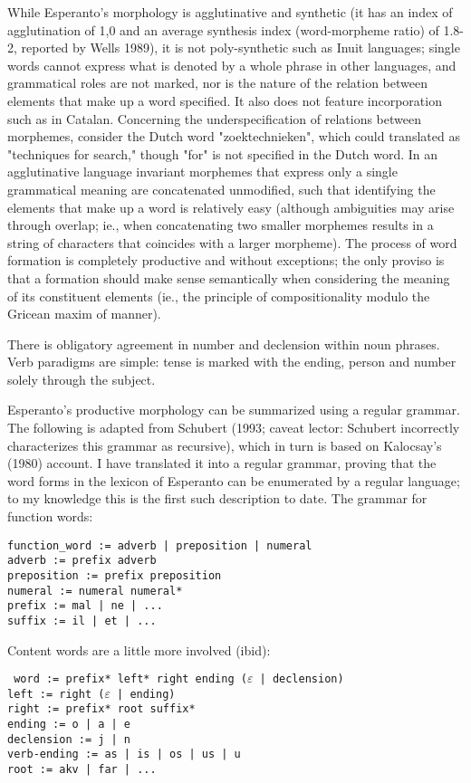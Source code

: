 \documentclass[10pt,a4paper]{article}
\begin{document}
While Esperanto's morphology is agglutinative and synthetic (it has an index of
agglutination of 1,0 and an average synthesis index (word-morpheme ratio) of
1.8-2, reported by Wells 1989), it is not poly-synthetic such as Inuit
languages; single words cannot express what is denoted by a whole phrase
in other languages, and grammatical roles are not marked, nor is the nature of
the relation between elements that make up a word specified. It also does not
feature incorporation such as in Catalan. Concerning the underspecification of
relations between morphemes, consider the Dutch word "zoektechnieken", which
could translated as "techniques for search," though "for" is not specified in
the Dutch word. In an agglutinative language invariant morphemes that express
only a single grammatical meaning are concatenated unmodified, such that
identifying the elements that make up a word is relatively easy (although
ambiguities may arise through overlap; ie., when concatenating two smaller
morphemes results in a string of characters that coincides with a larger
morpheme). The process of word formation is completely productive and without
exceptions; the only proviso is that a formation should make sense
semantically when considering the meaning of its constituent elements (ie.,
the principle of compositionality modulo the Gricean maxim of manner). 

There is obligatory agreement in number and declension within noun phrases.
Verb paradigms are simple: tense is marked with the ending, person and number
solely through the subject.

Esperanto's productive morphology can be summarized using a regular
grammar. The following is adapted from Schubert (1993; caveat lector: Schubert
incorrectly characterizes this grammar as recursive), which in turn is based
on Kalocsay's (1980) account. I have translated it into a regular grammar,
proving that the word forms in the lexicon of Esperanto can be enumerated by a
regular language; to my knowledge this is the first such description to date.
The grammar for function words: 

\begin{verbatim}
function_word := adverb | preposition | numeral
adverb := prefix adverb
preposition := prefix preposition
numeral := numeral numeral*
prefix := mal | ne | ...
suffix := il | et | ...
\end{verbatim}

Content words are a little more involved (ibid):

\texttt{
word := prefix* left* right ending ($\varepsilon$ | declension) \\
left := right ($\varepsilon$ | ending) \\
right := prefix* root suffix* \\
ending := o | a | e \\
declension := j | n \\
verb-ending := as | is | os | us | u \\
root := akv | far | ...
}
\end{document}
